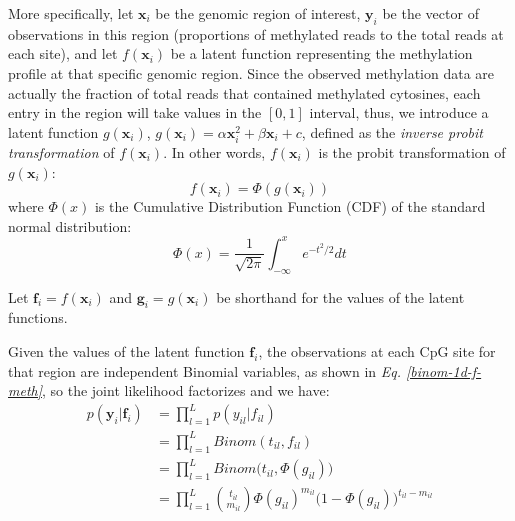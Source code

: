 More specifically, let $\mathbf{x}_{i}$ be the genomic region of interest, $\mathbf{y}_{i}$ be the vector of observations in this region (\ie proportions of methylated reads to the total reads at each site), and let $f(\mathbf{x}_{i})$ be a latent function representing the methylation profile at that specific genomic region. Since the observed methylation data are actually the fraction of total reads that contained methylated cytosines, each entry in the region will take values in the $[0, 1]$ interval, thus, we introduce a latent function $g(\mathbf{x}_{i})$, \eg $g(\mathbf{x}_{i}) = \alpha \mathbf{x}_{i}^{2} + \beta \mathbf{x}_{i} + c$, defined as the \emph{inverse probit transformation} of $f(\mathbf{x}_{i})$. In other words, $f(\mathbf{x}_{i})$ is the probit transformation of $g(\mathbf{x}_{i})$:
\begin{equation} \label{probit-transform-f-meth}
	f(\mathbf{x}_{i}) = \Phi(g(\mathbf{x}_{i}))
\end{equation}
where $\Phi(x)$ is the Cumulative Distribution Function (CDF) of the standard normal distribution:
\begin{equation} \label{cdf-stand-normal-f-meth}
	\Phi(x) = \frac{1}{\sqrt{2\pi}} \int_{-\infty}^{x} e^{-t^{2}/2}dt
\end{equation}

Let $\mathbf{f}_{i} = f(\mathbf{x}_{i})$ and $\mathbf{g}_{i} = g(\mathbf{x}_{i})$ be shorthand for the values of the latent functions.

Given the values of the latent function $\mathbf{f}_{i}$, the observations at each CpG site for that region are independent Binomial variables, as shown in \emph{Eq. \ref{binom-1d-f-meth}}, so the joint likelihood factorizes and we have:
\begin{equation} \label{likel-binom-prob-f-meth}
  \begin{split}
	p(\mathbf{y}_{i}|\mathbf{f}_{i}) & = \prod_{l=1}^{L} p(y_{il}|f_{il}) \\
							 & = \prod_{l=1}^{L} Binom(t_{il}, f_{il}) \\
							 & = \prod_{l=1}^{L} Binom\big(t_{il}, \Phi(g_{il})\big) \\
							 & = \prod_{l=1}^{L} \binom{t_{il}}{m_{il}} \Phi(g_{il})^{m_{il}} (1 - \Phi(g_{il})\big)^{t_{il} - m_{il}}
  \end{split}
\end{equation}

